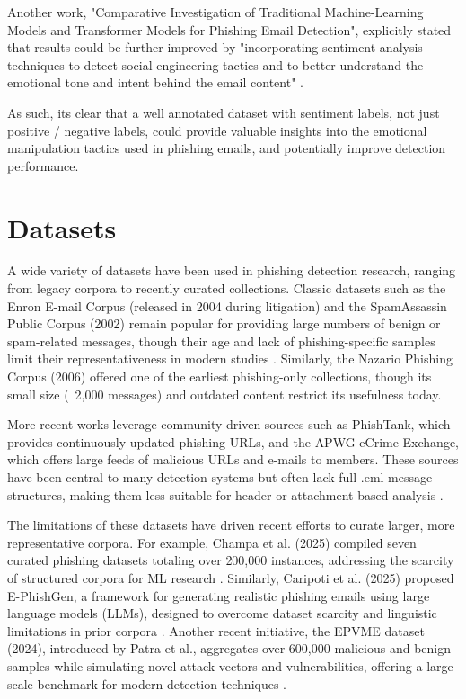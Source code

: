 Another work, "Comparative Investigation of Traditional Machine-Learning Models and Transformer Models for Phishing Email Detection", explicitly stated that results could be further improved by "incorporating sentiment analysis techniques to detect social-engineering tactics and to better understand the emotional tone and intent behind the email content" \cite{electronics13244877}.

As such, its clear that a well annotated dataset with sentiment labels, not just positive / negative labels, could provide valuable insights into the emotional manipulation tactics used in phishing emails, and potentially improve detection performance.

\section{Datasets}

A wide variety of datasets have been used in phishing detection research, ranging from legacy corpora to recently curated collections. Classic datasets such as the Enron E-mail Corpus (released in 2004 during litigation) and the SpamAssassin Public Corpus (2002) remain popular for providing large numbers of benign or spam-related messages, though their age and lack of phishing-specific samples limit their representativeness in modern studies \cite{metsis2006spam,klimt2004enron}. Similarly, the Nazario Phishing Corpus (2006) offered one of the earliest phishing-only collections, though its small size (~2,000 messages) and outdated content restrict its usefulness today.    

More recent works leverage community-driven sources such as PhishTank, which provides continuously updated phishing URLs, and the \ac{APWG} eCrime Exchange, which offers large feeds of malicious URLs and e-mails to members. These sources have been central to many detection systems but often lack full .eml message structures, making them less suitable for header or attachment-based analysis \cite{mahmoud2023phishing}.

The limitations of these datasets have driven recent efforts to curate larger, more representative corpora. For example, Champa et al. (2025) compiled seven curated phishing datasets totaling over 200,000 instances, addressing the scarcity of structured corpora for ML research \cite{champa2025curated}. Similarly, Caripoti et al. (2025) proposed E-PhishGen, a framework for generating realistic phishing emails using large language models (LLMs), designed to overcome dataset scarcity and linguistic limitations in prior corpora \cite{caripoti2025ephishgen}. Another recent initiative, the EPVME dataset (2024), introduced by Patra et al., aggregates over 600,000 malicious and benign samples while simulating novel attack vectors and vulnerabilities, offering a large-scale benchmark for modern detection techniques \cite{patra2024epvme}.


